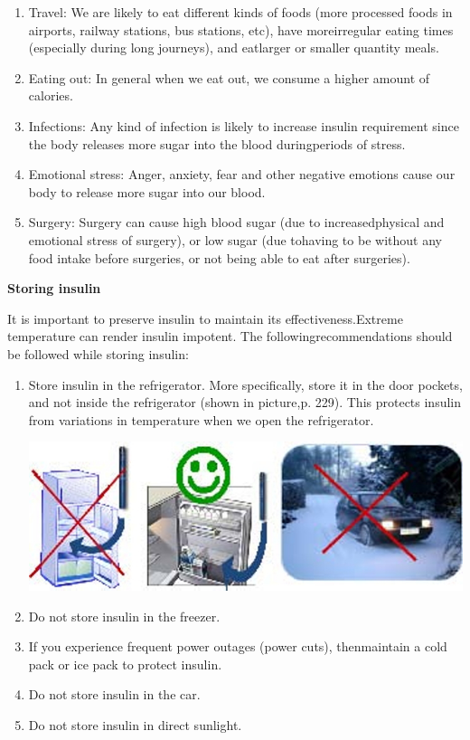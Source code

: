 \vspace{-\topsep}
\begin{enumerate}[•]
\itemsep=0pt
\item Travel: We are likely to eat different kinds of foods (more processed foods in airports, railway stations, bus stations, etc), have more\break irregular eating times (especially during long journeys), and eat\break larger or smaller quantity meals.
\item Eating out: In general when we eat out, we consume a higher amount of calories.
\item Infections: Any kind of infection is likely to increase insulin requirement since the body releases more sugar into the blood during\break periods of stress.
\item Emotional stress: Anger, anxiety, fear and other negative emotions cause our body to release more sugar into our blood.
\item Surgery: Surgery can cause high blood sugar (due to increased\break physical and emotional stress of surgery), or low sugar (due to\break having to be without any food intake before surgeries, or not being able to eat after surgeries).
\end{enumerate}
\vspace{-\topsep}

\noindent\textbf{Storing insulin}

It is important to preserve insulin to maintain its effectiveness.\break Extreme temperature can render insulin impotent. The following\break recommendations should be followed while storing insulin:

\vspace{-\topsep}
\begin{enumerate}[•]
\itemsep=0pt
\item Store insulin in the refrigerator. More specifically, store it in the door pockets, and not inside the refrigerator (shown in picture,\break p. 229). This protects insulin from variations in temperature when we open the refrigerator.

\includegraphics[scale=2.3]{images/089.jpg}

\item Do not store insulin in the freezer.
\item If you experience frequent power outages (power cuts), then\break maintain a cold pack or ice pack to protect insulin.
\item Do not store insulin in the car.
\item Do not store insulin in direct sunlight.
\end{enumerate}
\vspace{-\topsep}

